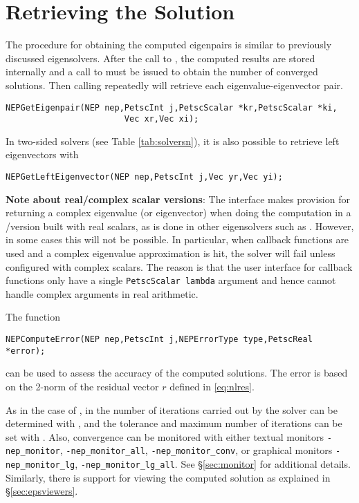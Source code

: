 \section{Retrieving the Solution}

The procedure for obtaining the computed eigenpairs is similar to previously discussed eigensolvers. After the call to , the computed results are stored internally and a call to  must be issued to obtain the number of converged solutions. Then calling  repeatedly will retrieve each eigenvalue-eigenvector pair.

	\begin{Verbatim}[fontsize=\small]
	NEPGetEigenpair(NEP nep,PetscInt j,PetscScalar *kr,PetscScalar *ki,
                        Vec xr,Vec xi);
	\end{Verbatim}
In two-sided solvers (see Table \ref{tab:solversn}), it is also possible to retrieve left eigenvectors with
	\begin{Verbatim}[fontsize=\small]
	NEPGetLeftEigenvector(NEP nep,PetscInt j,Vec yr,Vec yi);
	\end{Verbatim}

\textbf{Note about real/complex scalar versions}: The interface makes provision for returning a complex eigenvalue (or eigenvector) when doing the computation in a \petsc/\slepc version built with real scalars, as is done in other eigensolvers such as . However, in some cases this will not be possible. In particular, when callback functions are used and a complex eigenvalue approximation is hit, the solver will fail unless configured with complex scalars. The reason is that the user interface for callback functions only have a single \texttt{PetscScalar lambda} argument and hence cannot handle complex arguments in real arithmetic.

\medskip

The function
	\begin{Verbatim}[fontsize=\small]
	NEPComputeError(NEP nep,PetscInt j,NEPErrorType type,PetscReal *error);
	\end{Verbatim}
can be used to assess the accuracy of the computed solutions. The error is based on the 2-norm of the residual vector $r$ defined in \eqref{eq:nlres}.

As in the case of , in  the number of iterations carried out by the solver can be determined with , and the tolerance and maximum number of iterations can be set with . Also, convergence can be monitored with either textual monitors \Verb!-nep_monitor!, \Verb!-nep_monitor_all!, \Verb!-nep_monitor_conv!, or graphical monitors \Verb!-nep_monitor_lg!, \Verb!-nep_monitor_lg_all!. See \S\ref{sec:monitor} for additional details. Similarly, there is support for viewing the computed solution as explained in \S\ref{sec:epsviewers}.


